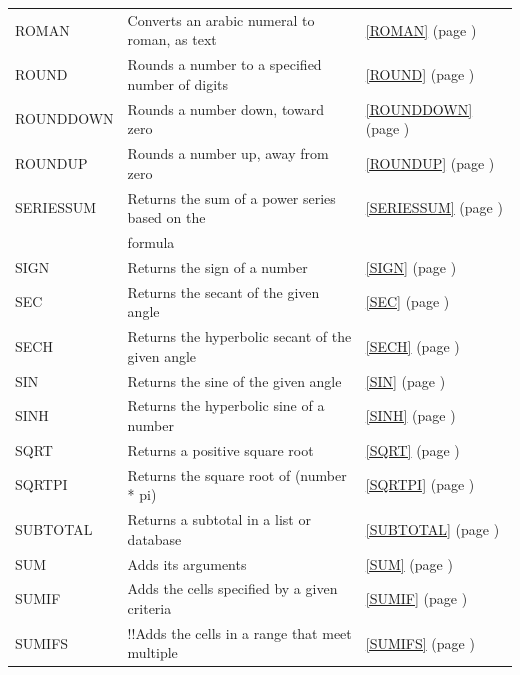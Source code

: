 \begin{center}
\begin{longtable}{l l l }
		ROMAN & Converts an arabic numeral to roman, as text &  \ref{ROMAN} (page \pageref{ROMAN}) \index{Spreadsheet Functions!ROMAN} \\
		ROUND & Rounds a number to a specified number of digits &  \ref{ROUND} (page \pageref{ROUND}) \index{Spreadsheet Functions!ROUND} \\
		ROUNDDOWN & Rounds a number down, toward zero &  \ref{ROUNDDOWN} (page \pageref{ROUNDDOWN}) \index{Spreadsheet Functions!ROUNDDOWN} \\
		ROUNDUP & Rounds a number up, away from zero &  \ref{ROUNDUP} (page \pageref{ROUNDUP}) \index{Spreadsheet Functions!ROUNDUP} \\
		SERIESSUM & Returns the sum of a power series based on the  &  \ref{SERIESSUM} (page \pageref{SERIESSUM}) \index{Spreadsheet Functions!SERIESSUM} \\
		& formula &   \\		
		SIGN  & Returns the sign of a number &  \ref{SIGN} (page \pageref{SIGN}) \index{Spreadsheet Functions!SIGN} \\			
		SEC   & Returns the secant of the given angle &  \ref{SEC} (page \pageref{SEC}) \index{Spreadsheet Functions!SEC} \\
		SECH   & Returns the hyperbolic secant of the given angle &  \ref{SECH} (page \pageref{SECH}) \index{Spreadsheet Functions!SECH} \\
		SIN   & Returns the sine of the given angle &  \ref{SIN} (page \pageref{SIN}) \index{Spreadsheet Functions!SIN} \\
		SINH  & Returns the hyperbolic sine of a number &  \ref{SINH} (page \pageref{SINH}) \index{Spreadsheet Functions!SINH} \\
		SQRT  & Returns a positive square root &  \ref{SQRT} (page \pageref{SQRT}) \index{Spreadsheet Functions!SQRT} \\
		SQRTPI & Returns the square root of (number * pi) &  \ref{SQRTPI} (page \pageref{SQRTPI}) \index{Spreadsheet Functions!SQRTPI} \\
		SUBTOTAL & Returns a subtotal in a list or database &  \ref{SUBTOTAL} (page \pageref{SUBTOTAL}) \index{Spreadsheet Functions!SUBTOTAL} \\
		SUM   & Adds its arguments &  \ref{SUM} (page \pageref{SUM}) \index{Spreadsheet Functions!SUM} \\
		SUMIF & Adds the cells specified by a given criteria &  \ref{SUMIF} (page \pageref{SUMIF}) \index{Spreadsheet Functions!SUMIF} \\
		SUMIFS & !!Adds the cells in a range that meet multiple &  \ref{SUMIFS} (page \pageref{SUMIFS}) \index{Spreadsheet Functions!SUMIFS} \\

\end{longtable}
\end{center}
